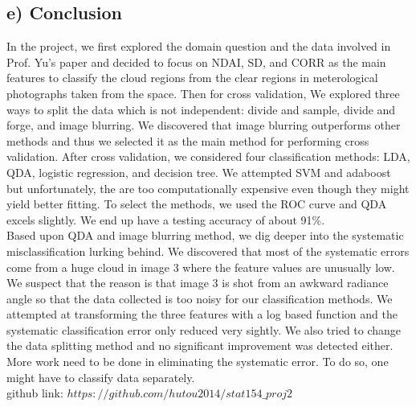 \documentclass[jou]{apa}%
\begin{document}
\subsection{e) Conclusion}
In the project, we first explored the domain question and the data involved in Prof. Yu's paper and decided to focus on NDAI, SD, and CORR as the main features to classify the cloud regions from the clear regions in meterological photographs taken from the space. Then for cross validation, We explored three ways to split the data which is not independent: divide and sample, divide and forge, and image blurring. We discovered that image blurring outperforms other methods and thus we selected it as the main method for performing cross validation. After cross validation, we considered four classification methods: LDA, QDA, logistic regression, and decision tree. We attempted SVM and adaboost but unfortunately, the are too computationally expensive even though they might yield better fitting. To select the methods, we used the ROC curve and QDA excels slightly. We end up have a testing accuracy of about 91\%.\\
\indent Based upon QDA and image blurring method, we dig deeper into the systematic misclassification lurking behind. We discovered that most of the systematic errors come from a huge cloud in image 3 where the feature values are unusually low. We suspect that the reason is that image 3 is shot from an awkward radiance angle so that the data collected is too noisy for our classification methods. We attempted at transforming the three features with a log based function and the systematic classification error only reduced very sightly. We also tried to change the data splitting method and no significant improvement was detected either. More work need to be done in eliminating the systematic error. To do so, one might have to classify data separately.\\


github link: \href{https://github.com/hutou2014/stat154_proj2}{$https://github.com/hutou2014/stat154\_proj2$}
\end{document}
